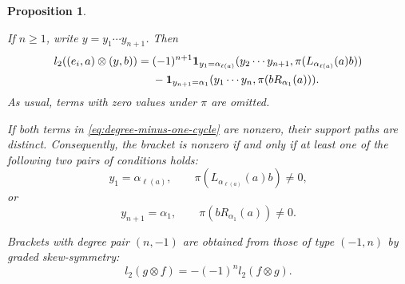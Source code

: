 \documentclass[11pt,a4paper,reqno]{amsart}
\newcommand{\para}[2]{(#1,#2)}
\newcommand{\one}{\mathbf 1}
\theoremstyle{plain}
\newtheorem{proposition}[proposition]{Proposition}
\theoremstyle{definition}
\numberwithin{equation}{section}
\begin{document}
\begin{proposition}
\begin{enumerate}
			If $n\geq1$, write $y=y_1\cdots y_{n+1}$.
			Then
			\begin{align}
				l_2(
				\para{e_i}{a}\otimes\para{y}{b}
				)
				={}&
				(-1)^{n+1}
				\one_{y_1=\alpha_{\ell(a)}}
				\para{y_2\cdots y_{n+1}}
				{\pi(L_{\alpha_{\ell(a)}}(a)b)}
				\notag\\
				&-
				\one_{y_{n+1}=\alpha_1}
				\para{y_1\cdots y_n}
				{\pi(bR_{\alpha_1}(a))}.
				\label{eq:degree-minus-one-cycle}
			\end{align}
			As usual, terms with zero values under $\pi$ are omitted.
			
			If both terms in \eqref{eq:degree-minus-one-cycle} are nonzero, their
			support paths are distinct. Consequently, the bracket is nonzero if
			and only if at least one of the following two pairs of conditions holds:
			\[
			y_1=\alpha_{\ell(a)},\qquad
			\pi(L_{\alpha_{\ell(a)}}(a)b)\neq0,
			\]
			or
			\[
			y_{n+1}=\alpha_1,\qquad
			\pi(bR_{\alpha_1}(a))\neq0.
			\]
		\end{enumerate}
		
		Brackets with degree pair $(n,-1)$ are obtained from those of type
		$(-1,n)$ by graded skew-symmetry:
		\[
		l_2(g\otimes f)
		=
		-(-1)^n l_2(f\otimes g).
		\]
	\end{proposition}
	
\end{document}
